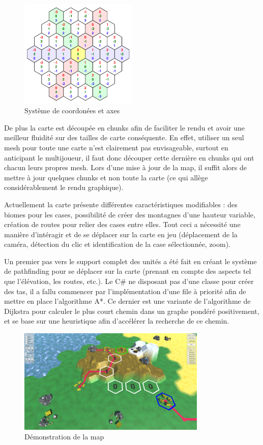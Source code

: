 \documentclass[12pt]{report}
\begin{document}
\begin{figure}[H]
    \centering
    \includegraphics[width=0.5\textwidth]{cubic_coordinates}
    \caption{Système de coordonées et axes}
\end{figure}

De plus la carte est découpée en chunks afin de faciliter le rendu et avoir une meilleur fluidité sur des tailles de carte conséquente. En effet, utiliser un seul mesh pour toute une carte n’est clairement pas envisageable, surtout en anticipant le multijoueur, il faut donc découper cette dernière en chunks qui ont chacun leurs propres mesh. Lors d’une mise à jour de la map, il suffit alors de mettre à jour quelques chunks et non toute la carte (ce qui allège considérablement le rendu graphique).

Actuellement la carte présente différentes caractéristiques modifiables : des biomes pour les cases, possibilité de créer des montagnes d’une hauteur variable, création de routes pour relier des cases entre elles. Tout ceci a nécessité une manière d’intéragir et de se déplacer sur la carte en jeu (déplacement de la caméra, détection du clic et identification de la case sélectionnée, zoom).

Un premier pas vers le support complet des unités a été fait en créant le système de pathfinding pour se déplacer sur la carte (prenant en compte des aspects tel que l’élévation, les routes, etc.). Le C\# ne disposant pas d’une classe pour créer des tas, il a fallu commencer par l’implémentation d’une file à priorité afin de mettre en place l’algorithme A*. Ce dernier est une variante de l’algorithme de Dijkstra pour calculer le plus court chemin dans un graphe pondéré positivement, et se base sur une heuristique afin d’accélérer la recherche de ce chemin.

\begin{figure}[H]
    \centering
    \includegraphics[width=0.8\textwidth]{map_features}
    \caption{Démonstration de la map}
\end{figure}
\end{document}
